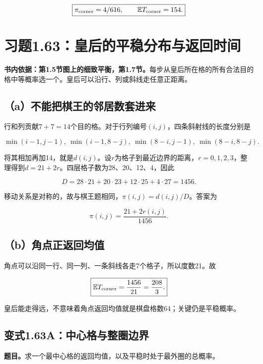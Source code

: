 \documentclass[
  11pt,a4paper,UTF8,fontset=fandol]{ctexart}
\begin{document}
\[\boxed{\pi_{\rm corner}=4/616,\qquad\mathbb ET_{\rm corner}=154.}\]

\section{习题1.63：皇后的平稳分布与返回时间}\label{ux4e60ux98981.63ux7687ux540eux7684ux5e73ux7a33ux5206ux5e03ux4e0eux8fd4ux56deux65f6ux95f4}

\textbf{书内依据：第1.5节图上的细致平衡，第1.7节。}每步从皇后所在格的所有合法目的格中等概率选一个。皇后可以沿行、列或斜线走任意正距离。

\subsection{（a）不能把棋王的邻居数套进来}\label{aux4e0dux80fdux628aux68cbux738bux7684ux90bbux5c45ux6570ux5957ux8fdbux6765}

行和列贡献\(7+7=14\)个目的格。对于行列编号\((i,j)\)，四条斜射线的长度分别是

\[\min(i-1,j-1),\ \min(i-1,8-j),\ \min(8-i,j-1),\ \min(8-i,8-j).\]

将其相加再加14，就是\(d(i,j)\)。设\(r\)为格子到最近边界的距离，\(r=0,1,2,3\)，整理得到\(d=21+2r\)。四层格子数为28、20、12、4，因此

\[D=28\cdot21+20\cdot23+12\cdot25+4\cdot27=1456.\]

移动关系是对称的，故与棋王题相同，\(\pi(i,j)=d(i,j)/D\)。答案为

\[\boxed{\pi(i,j)=\frac{21+2r(i,j)}{1456}.}\]

\subsection{（b）角点正返回均值}\label{bux89d2ux70b9ux6b63ux8fd4ux56deux5747ux503c}

角点可以沿同一行、同一列、一条斜线各走7个格子，所以度数21。故

\[\boxed{\mathbb E T_{\rm corner}=\frac{1456}{21}=\frac{208}{3}.}\]

皇后能走得远，不意味着角点返回均值就是棋盘格数64；关键仍是平稳概率。

\subsection{变式1.63A：中心格与整圈边界}\label{ux53d8ux5f0f1.63aux4e2dux5fc3ux683cux4e0eux6574ux5708ux8fb9ux754c}

\textbf{题目。}求一个最中心格的返回均值，以及平稳时处于最外圈的总概率。
\end{document}

